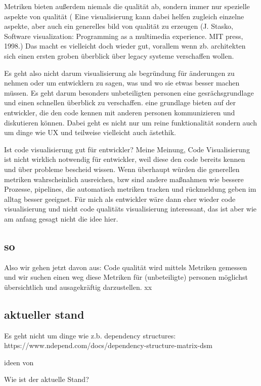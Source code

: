 Metriken bieten außerdem niemals die qualität ab, sondern immer nur spezielle aspekte von qualität (%
Eine visualisierung kann dabei helfen zugleich einzelne aspekte, aber auch ein generelles bild von qualität zu erzeugen (J. Stasko, Software visualization: Programming as a multimedia experience. MIT press, 1998.)
Das macht es vielleicht doch wieder gut, vorallem wenn zb. architekten sich einen ersten groben überblick über legacy systeme verschaffen wollen.

Es geht also nicht darum visualisierung als begründung für änderungen zu nehmen oder um entwicklern zu sagen, was und wo sie etwas besser machen müssen.
Es geht darum besonders unbeteiligten personen eine gesrächsgrundlage und einen schnellen überblick zu verschaffen. eine grundlage bieten auf der entwickler, die den code kennen mit anderen personen kommunizieren und diskutieren können. Dabei geht es nicht nur um reine funktionalität sondern auch um dinge wie UX und teilweise vielleicht auch ästethik.


Ist code visualisierung gut für entwickler?
Meine Meinung, Code Visualisierung ist nicht wirklich notwendig für entwickler, weil diese den code bereits kennen und über probleme bescheid wissen. Wenn überhaupt würden die generellen metriken wahrscheinlich ausreichen, bzw sind andere maßnahmen wie bessere Prozesse, pipelines, die automatisch metriken tracken und rückmeldung geben im alltag besser geeignet.
Für mich als entwickler wäre dann eher wieder code visualisierung und nicht code qualitäts visualisierung interessant, das ist aber wie am anfang gesagt nicht die idee hier.

\subsection{so}
Also wir gehen jetzt davon aus:
Code qualität wird mittels Metriken gemessen und wir suchen einen weg diese Metriken für (unbeteiligte) personen möglichst übersichtlich und ausagekräftig darzustellen.
xx

\subsection{aktueller stand}
Es geht nicht um dinge wie z.b. dependency structures: https://www.ndepend.com/docs/dependency-structure-matrix-dsm


ideen von \cite{ennowulff_2021}

Wie ist der aktuelle Stand?



